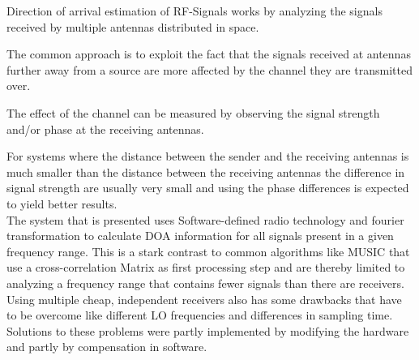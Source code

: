 Direction of arrival estimation of RF-Signals
works by analyzing the signals received by
multiple antennas distributed in space.

The common approach is to exploit the fact
that the signals received at antennas further
away from a source are more affected by the channel
they are transmitted over.

The effect of the channel can be measured by
observing the signal strength and/or phase
at the receiving antennas.

For systems where the distance between
the sender and the receiving antennas is much
smaller than the distance between the receiving
antennas the difference in signal strength
are usually very small and using the phase
differences is expected to yield better results. \\

The system that is presented uses Software-defined radio
technology and fourier transformation to calculate DOA
information for all signals present in a given frequency range.
This is a stark contrast to common algorithms like
MUSIC that use a cross-correlation Matrix as first
processing step and are thereby limited to analyzing
a frequency range that contains fewer signals than there
are receivers. \\

Using multiple cheap, independent receivers also
has some drawbacks that have to be overcome like
different LO frequencies and differences in sampling
time. Solutions to these problems were partly implemented
by modifying the hardware and partly by compensation
in software.

